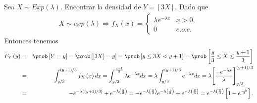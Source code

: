 \begin{Ejem}
Sea $X \sim Exp  \left( \lambda \right)$. Encontrar la densidad de $Y = \left[ 3X \right] $. Dado que
\begin{eqnarray*}
X \sim exp \left( \lambda \right) \Rightarrow f_{X}\left( x \right) = \left\{\begin{array}{ll} \lambda  e^{-\lambda x} & x > 0 ,\\ 
0 & e.o.c. 
\end{array}
\right.
\end{eqnarray*}
Entonces tenemos
\begin{eqnarray*}
F_{Y}\left( y \right) &=& \prob\left[Y=y\right]=\prob\left[\left[ 3X\right]=y\right]=\prob\left[y\leq3X<y+1\right]=\prob\left[\frac{y}{3}\leq X\leq\frac{y+1}{3}\right]\\
&=&\int_{y/3}^{(y+1)/3} f_{X}\left(x \right)dx 
=\int_{y/3}^{\frac{y+1}{3}}\lambda e^{-\lambda x}dx = \lambda \int_{y/3}^{(y+1)/3 } e^{-\lambda x}dx =\lambda \Bigg[\dfrac{-e^{-\lambda x}}{\lambda}\Bigg]_{y/3}^{(y+1)/3} \\
&=&-e^{-\lambda\left((y+1)/3 \right)}+e^{-\lambda\left(\frac{y}{3}\right)}=-e^{-\lambda\left(\frac{y}{3}\right)} e^{-\lambda\left(\frac{1}{3}\right)}+e^{-\lambda\left(\frac{y}{3}\right)}=e^{-\lambda\left(\frac{y}{3}\right)}\left[1-e^{\frac{-\lambda}{3}}\right].
\end{eqnarray*}

\end{Ejem}

